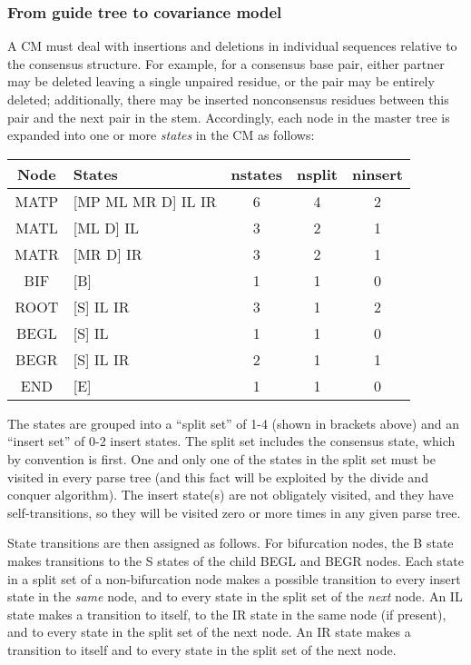 \documentclass[11pt]{article}
\begin{document}
\subsubsection{From guide tree to covariance model}

A CM must deal with insertions and deletions in individual sequences
relative to the consensus structure. For example, for a consensus base
pair, either partner may be deleted leaving a single unpaired residue,
or the pair may be entirely deleted; additionally, there may be
inserted nonconsensus residues between this pair and the next pair in
the stem. Accordingly, each node in the master tree is expanded into
one or more \emph{states} in the CM as follows:

\begin{tabular}{clccc}
Node   &  States             & nstates & nsplit & ninsert \\ \hline
MATP   & [MP ML MR D] IL IR  &   6     &   4    &  2   \\
MATL   & [ML D] IL           &   3     &   2    &  1   \\
MATR   & [MR D] IR           &   3     &   2    &  1   \\
BIF    & [B]                 &   1     &   1    &  0   \\
ROOT   & [S] IL IR           &   3     &   1    &  2   \\
BEGL   & [S] IL              &   1     &   1    &  0   \\
BEGR   & [S] IL IR           &   2     &   1    &  1   \\
END    & [E]                 &   1     &   1    &  0   \\ \hline
\end{tabular}

The states are grouped into a ``split set'' of 1-4 (shown in brackets
above) and an ``insert set'' of 0-2 insert states. The split set
includes the consensus state, which by convention is first. One and
only one of the states in the split set must be visited in every parse
tree (and this fact will be exploited by the divide and conquer
algorithm). The insert state(s) are not obligately visited, and they
have self-transitions, so they will be visited zero or more times in
any given parse tree.

State transitions are then assigned as follows. For bifurcation nodes,
the B state makes transitions to the S states of the child BEGL and
BEGR nodes. Each state in a split set of a non-bifurcation node makes
a possible transition to every insert state in the \emph{same} node,
and to every state in the split set of the \emph{next} node. An IL
state makes a transition to itself, to the IR state in the same node
(if present), and to every state in the split set of the next node. An
IR state makes a transition to itself and to every state in the split
set of the next node.
\end{document}
